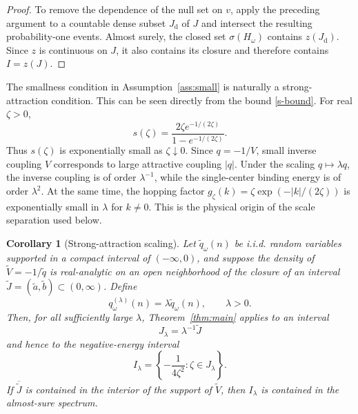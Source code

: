 \documentclass[12pt,a4paper]{article}
\numberwithin{equation}{section}
\newtheorem{cor}[thm]{Corollary}
\begin{document}
\begin{proof}
To remove the dependence of the null set on $v$, apply the preceding argument
to a countable dense subset $J_{\mathrm d}$ of $J$ and intersect the resulting
probability-one events.  Almost surely, the closed set $\sigma(H_\omega)$
contains $z(J_{\mathrm d})$.  Since $z$ is continuous on $J$,
it also contains its closure and therefore contains $I=z(J)$.
\end{proof}

The smallness condition in Assumption~\ref{ass:small} is naturally a
strong-attraction condition.  This can be seen directly from the bound
\eqref{s-bound}.  For real $\zeta>0$,
\begin{equation}
s(\zeta)
 =\frac{2\zeta e^{-1/(2\zeta)}}{1-e^{-1/(2\zeta)}}.
\label{s-real}
\end{equation}
Thus $s(\zeta)$ is exponentially small as $\zeta\downarrow0$.  Since
$q=-1/V$, small inverse coupling $V$ corresponds to large attractive
coupling $|q|$.  Under the scaling $q\mapsto\lambda q$, the inverse coupling
is of order $\lambda^{-1}$, while the single-center binding energy is of order
$\lambda^2$.  At the same time, the hopping factor
$g_\zeta(k)=\zeta\exp(-|k|/(2\zeta))$ is exponentially small in $\lambda$ for
$k\ne0$.  This is the physical origin of the scale separation used below.

\begin{cor}[Strong-attraction scaling]\label{cor:scaling}
Let $\widetilde q_\omega(n)$ be i.i.d. random variables supported in a
compact interval of $(-\infty,0)$, and suppose the density of
$\widetilde V=-1/\widetilde q$ is real-analytic on an open neighborhood of
the closure of an interval
$\widetilde J=(\widetilde a,\widetilde b)\subset(0,\infty)$.  Define
$$
q_\omega^{(\lambda)}(n)=\lambda\widetilde q_\omega(n),
\qquad \lambda>0.
$$
Then, for all sufficiently large $\lambda$, Theorem~\ref{thm:main} applies
to an interval
$$
J_\lambda=\lambda^{-1}\widetilde J
$$
and hence to the negative-energy interval
$$
I_\lambda
 =\left\{-\frac{1}{4\zeta^2}:\zeta\in J_\lambda\right\}.
$$
If $\overline{\widetilde J}$ is contained in the interior of the support of
$\widetilde V$, then $I_\lambda$ is contained in the almost-sure spectrum.
\end{cor}
\end{document}

